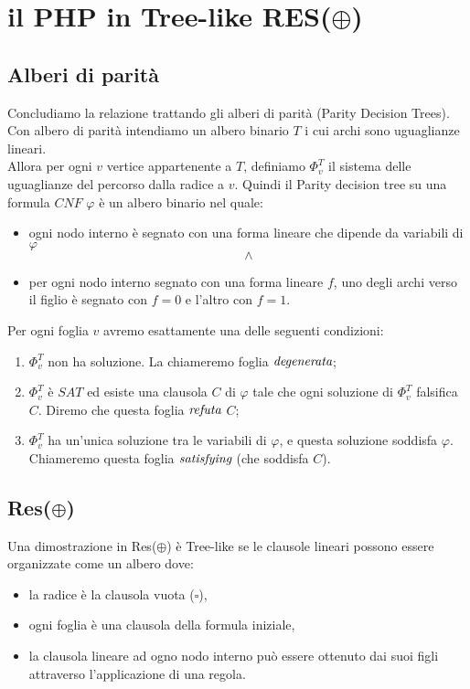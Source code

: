 \documentclass[it]{article}
\begin{document}
\section{il PHP in Tree-like RES($\oplus$)}
    \subsection{Alberi di parità}
    Concludiamo la relazione trattando gli alberi di parità (Parity Decision Trees).
    Con albero di parità intendiamo un albero binario ${\displaystyle T}$ i cui archi sono uguaglianze lineari.\cite{krajicek2019proof} \\
    Allora per ogni ${\displaystyle v}$ vertice appartenente a ${\displaystyle T}$, definiamo $\Phi_{v}^{T}$ il sistema delle uguaglianze del percorso dalla radice a ${\displaystyle v}$. Quindi il Parity decision tree su una formula ${\displaystyle CNF}$ $\varphi$ è un albero binario nel quale:
    \begin{itemize}
        \item ogni nodo interno è segnato con una forma lineare che dipende da variabili di ${\varphi}$
        $$\land$$
        \item per ogni nodo interno segnato con una forma lineare ${\displaystyle f}$, uno degli archi verso il figlio è segnato con $f=0$ e l'altro con $f=1$.
    \end{itemize}
    Per ogni foglia ${\displaystyle v}$ avremo esattamente una delle seguenti condizioni:
    \begin{enumerate}
        \item $\Phi_{v}^{T}$ non ha soluzione. La chiameremo foglia $\emph{degenerata}$;
        \item $\Phi_{v}^{T}$ è ${\displaystyle SAT}$ ed esiste una clausola ${\displaystyle C}$ di $\varphi$ tale che ogni soluzione di $\Phi_{v}^{T}$ falsifica ${\displaystyle C}$. Diremo che questa foglia $\emph{refuta}$ ${\displaystyle C}$;
        \item $\Phi_{v}^{T}$ ha un'unica soluzione tra le variabili di $\varphi$, e questa soluzione soddisfa $\varphi$. Chiameremo questa foglia $\emph{satisfying}$ (che soddisfa ${\displaystyle C}$).
    \end{enumerate}
    \subsection{Res($\oplus$)}
    Una dimostrazione in Res($\oplus$) è Tree-like se le clausole lineari possono essere organizzate come un albero dove:
    \begin{itemize}
        \item la radice è la clausola vuota ($\square$),
        \item ogni foglia è una clausola della formula iniziale,
        \item la clausola lineare ad ogno nodo interno può essere ottenuto dai suoi figli attraverso l'applicazione di una regola.
    \end{itemize}
\end{document}

